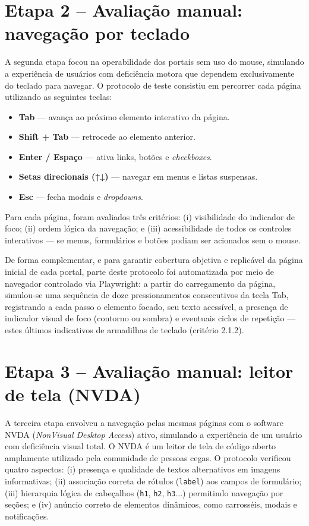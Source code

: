 \documentclass[brazil]{ifpr-pinhais}
\begin{document}
\section{Etapa 2 -- Avaliação manual: navegação por teclado}

A segunda etapa focou na operabilidade dos portais sem uso do mouse, simulando a experiência de usuários com deficiência motora que dependem exclusivamente do teclado para navegar. O protocolo de teste consistiu em percorrer cada página utilizando as seguintes teclas:

\begin{itemize}
  \item \textbf{Tab} --- avança ao próximo elemento interativo da página.
  \item \textbf{Shift + Tab} --- retrocede ao elemento anterior.
  \item \textbf{Enter / Espaço} --- ativa links, botões e \textit{checkboxes}.
  \item \textbf{Setas direcionais (↑↓)} --- navegar em menus e listas suspensas.
  \item \textbf{Esc} --- fecha modais e \textit{dropdowns}.
\end{itemize}

Para cada página, foram avaliados três critérios: (i) visibilidade do indicador de foco; (ii) ordem lógica da navegação; e (iii) acessibilidade de todos os controles interativos --- se menus, formulários e botões podiam ser acionados sem o mouse.

De forma complementar, e para garantir cobertura objetiva e replicável da página inicial de cada portal, parte deste protocolo foi automatizada por meio de navegador controlado via Playwright: a partir do carregamento da página, simulou-se uma sequência de doze pressionamentos consecutivos da tecla Tab, registrando a cada passo o elemento focado, seu texto acessível, a presença de indicador visual de foco (contorno ou sombra) e eventuais ciclos de repetição --- estes últimos indicativos de armadilhas de teclado (critério 2.1.2).

\section{Etapa 3 -- Avaliação manual: leitor de tela (NVDA)}

A terceira etapa envolveu a navegação pelas mesmas páginas com o software NVDA (\textit{NonVisual Desktop Access}) \cite{nvda2026} ativo, simulando a experiência de um usuário com deficiência visual total. O NVDA é um leitor de tela de código aberto amplamente utilizado pela comunidade de pessoas cegas. O protocolo verificou quatro aspectos: (i) presença e qualidade de textos alternativos em imagens informativas; (ii) associação correta de rótulos (\texttt{label}) aos campos de formulário; (iii) hierarquia lógica de cabeçalhos (\texttt{h1}, \texttt{h2}, \texttt{h3}...) permitindo navegação por seções; e (iv) anúncio correto de elementos dinâmicos, como carrosséis, modais e notificações.
\end{document}
